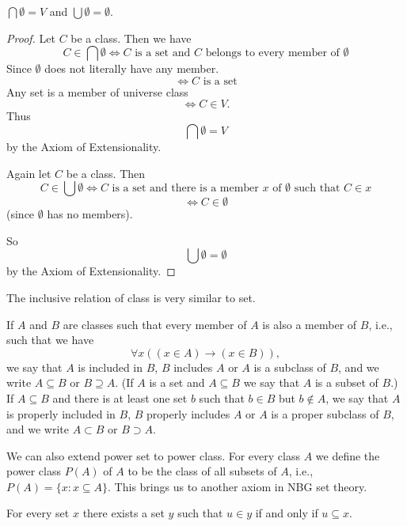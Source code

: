 \begin{lemma}
    $\bigcap \emptyset= V$ and $\bigcup \emptyset= \emptyset.$ 
    \end{lemma}
    \begin{proof}
        Let \( C \) be a class. Then we have
        \[
        C \in \bigcap \emptyset \iff C \text{ is a set and } C \text{ belongs to every member of } \emptyset
        \]
        Since $\emptyset$ does not literally have any member.
        \[
        \iff C \text{ is a set}
        \]
        Any set is a member of universe class
        \[
        \iff C \in V.
        \]
        Thus
        \[
        \bigcap \emptyset = V
        \]
        by the Axiom of Extensionality.

        Again let \( C \) be a class. Then
        \[
        C \in \bigcup \emptyset \iff C \text{ is a set and there is a member } x \text{ of } \emptyset \text{ such that } C \in x
        \]
        \[
        \iff C \in \emptyset
        \]
        (since \( \emptyset \) has no members).

        So
        \[
        \bigcup \emptyset = \emptyset
        \]
        by the Axiom of Extensionality.
    \end{proof}
    The inclusive relation of class is very similar to set.
    \begin{definition}
        If \( A \) and \( B \) are classes such that every member of \( A \) is also a member of \( B \), 
        i.e., such that we have
        \[
        \forall x ((x \in A) \to (x \in B)),
        \]
        we say that \( A \) is included in \( B \), \( B \) includes \( A \) or \( A \) is a subclass of 
        \( B \), and we write \( A \subseteq B \) or \( B \supseteq A \). (If \( A \) is a set and 
        \( A \subseteq B \) we say that \( A \) is a subset of \( B \).) If \( A \subseteq B \) and there 
        is at least one set \( b \) such that \( b \in B \) but \( b \not\in A \), we say that \( A \) is 
        properly included in \( B \), \( B \) properly includes \( A \) or \( A \) is a proper subclass of 
        \( B \), and we write \( A \subset B \) or \( B \supset A \).
        \end{definition}

        We can also extend power set to power class.
        For every class \( A \) we define the power class \( P(A) \) of \( A \) to be the class of all subsets of \( A \), i.e., \( P(A) = \{x : x \subseteq A\} \).
        This brings us to another axiom in NBG set theory.
        \begin{axiom}
        For every set \( x \) there exists a set \( y \) such that \( u \in y \) if and only if \( u \subseteq x \).
        \end{axiom}
        
